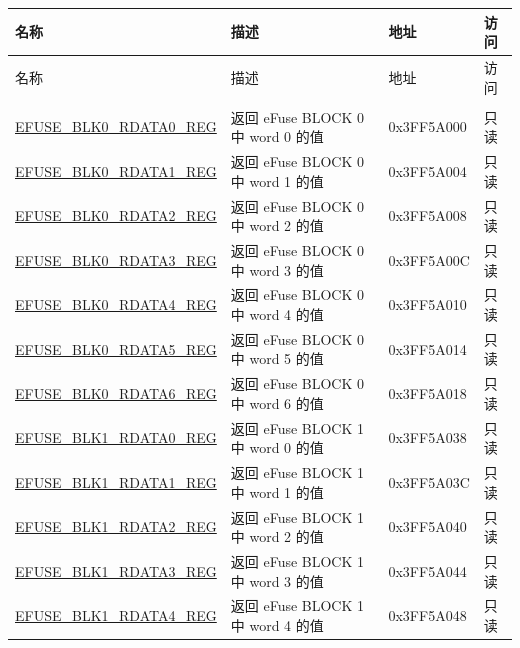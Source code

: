 \begin{longtable}{ | p{5cm} | p{7.5cm} | p{2cm} | p{1cm} | }
    \hline
    \rowcolor{lightgray}
    名称 & 描述 &  地址 & 访问 \\ \hline
            \endfirsthead
            \hline
            \rowcolor{lightgray}
    名称 & 描述 &  地址 & 访问 \\
            \hline
            \endhead
            \endfoot
    \multicolumn{4}{|l|}{\textbf{eFuse 读取寄存器}} \\ \hline
    \hyperref[regdesc:EFUSEBLK0RDATA0REG]{EFUSE\_BLK0\_RDATA0\_REG} & 返回 eFuse BLOCK 0 中 word 0 的值 & 0x3FF5A000 & 只读 \\ \hline
    \hyperref[regdesc:EFUSEBLK0RDATA1REG]{EFUSE\_BLK0\_RDATA1\_REG} & 返回 eFuse BLOCK 0 中 word 1 的值 & 0x3FF5A004 & 只读 \\ \hline
    \hyperref[regdesc:EFUSEBLK0RDATA2REG]{EFUSE\_BLK0\_RDATA2\_REG} & 返回 eFuse BLOCK 0 中 word 2 的值 & 0x3FF5A008 & 只读 \\ \hline
    \hyperref[regdesc:EFUSEBLK0RDATA3REG]{EFUSE\_BLK0\_RDATA3\_REG} & 返回 eFuse BLOCK 0 中 word 3 的值 & 0x3FF5A00C & 只读 \\ \hline
    \hyperref[regdesc:EFUSEBLK0RDATA4REG]{EFUSE\_BLK0\_RDATA4\_REG} & 返回 eFuse BLOCK 0 中 word 4 的值 & 0x3FF5A010 & 只读 \\ \hline
    \hyperref[regdesc:EFUSEBLK0RDATA5REG]{EFUSE\_BLK0\_RDATA5\_REG} & 返回 eFuse BLOCK 0 中 word 5 的值 & 0x3FF5A014 & 只读 \\ \hline
    \hyperref[regdesc:EFUSEBLK0RDATA6REG]{EFUSE\_BLK0\_RDATA6\_REG} & 返回 eFuse BLOCK 0 中 word 6 的值 & 0x3FF5A018 & 只读 \\ \hline
    \hyperref[regdesc:EFUSEBLK1RDATAnREG]{EFUSE\_BLK1\_RDATA0\_REG} & 返回 eFuse BLOCK 1 中 word 0 的值 & 0x3FF5A038 & 只读 \\ \hline
    \hyperref[regdesc:EFUSEBLK1RDATAnREG]{EFUSE\_BLK1\_RDATA1\_REG} & 返回 eFuse BLOCK 1 中 word 1 的值 & 0x3FF5A03C & 只读 \\ \hline
    \hyperref[regdesc:EFUSEBLK1RDATAnREG]{EFUSE\_BLK1\_RDATA2\_REG} & 返回 eFuse BLOCK 1 中 word 2 的值 & 0x3FF5A040 & 只读 \\ \hline
    \hyperref[regdesc:EFUSEBLK1RDATAnREG]{EFUSE\_BLK1\_RDATA3\_REG} & 返回 eFuse BLOCK 1 中 word 3 的值 & 0x3FF5A044 & 只读 \\ \hline
    \hyperref[regdesc:EFUSEBLK1RDATAnREG]{EFUSE\_BLK1\_RDATA4\_REG} & 返回 eFuse BLOCK 1 中 word 4 的值 & 0x3FF5A048 & 只读 \\ \hline

\end{longtable}
